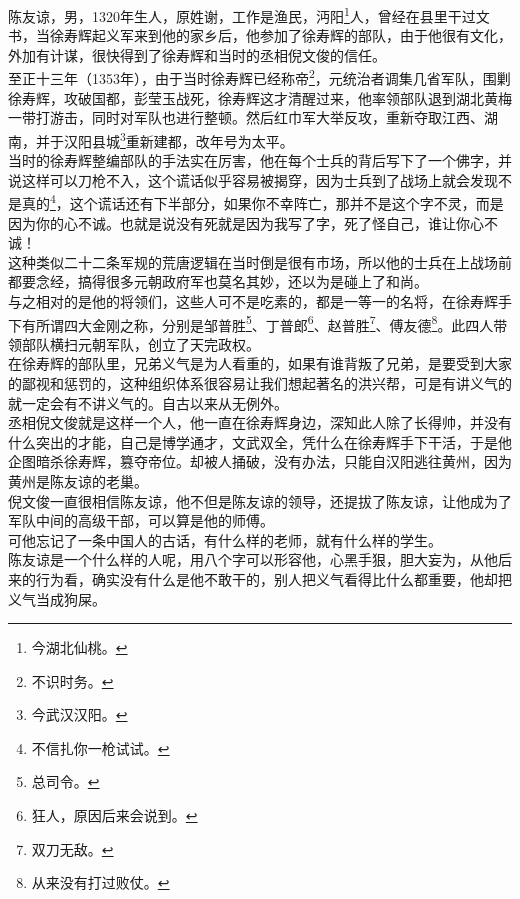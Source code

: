 \begin{multicols}{\theparacolNo}
陈友谅，男，1320年生人，原姓谢，工作是渔民，沔阳\footnote{今湖北仙桃。}人，曾经在县里干过文书，当徐寿辉起义军来到他的家乡后，他参加了徐寿辉的部队，由于他很有文化，外加有计谋，很快得到了徐寿辉和当时的丞相倪文俊的信任。\\

至正十三年（1353年），由于当时徐寿辉已经称帝\footnote{不识时务。}，元统治者调集几省军队，围剿徐寿辉，攻破国都，彭莹玉战死，徐寿辉这才清醒过来，他率领部队退到湖北黄梅一带打游击，同时对军队也进行整顿。然后红巾军大举反攻，重新夺取江西、湖南，并于汉阳县城\footnote{今武汉汉阳。}重新建都，改年号为太平。\\

当时的徐寿辉整编部队的手法实在厉害，他在每个士兵的背后写下了一个佛字，并说这样可以刀枪不入，这个谎话似乎容易被揭穿，因为士兵到了战场上就会发现不是真的\footnote{不信扎你一枪试试。}，这个谎话还有下半部分，如果你不幸阵亡，那并不是这个字不灵，而是因为你的心不诚。也就是说没有死就是因为我写了字，死了怪自己，谁让你心不诚！\\

这种类似二十二条军规的荒唐逻辑在当时倒是很有市场，所以他的士兵在上战场前都要念经，搞得很多元朝政府军也莫名其妙，还以为是碰上了和尚。\\

与之相对的是他的将领们，这些人可不是吃素的，都是一等一的名将，在徐寿辉手下有所谓四大金刚之称，分别是邹普胜\footnote{总司令。}、丁普郎\footnote{狂人，原因后来会说到。}、赵普胜\footnote{双刀无敌。}、傅友德\footnote{从来没有打过败仗。}。此四人带领部队横扫元朝军队，创立了天完政权。\\

在徐寿辉的部队里，兄弟义气是为人看重的，如果有谁背叛了兄弟，是要受到大家的鄙视和惩罚的，这种组织体系很容易让我们想起著名的洪兴帮，可是有讲义气的就一定会有不讲义气的。自古以来从无例外。\\

丞相倪文俊就是这样一个人，他一直在徐寿辉身边，深知此人除了长得帅，并没有什么突出的才能，自己是博学通才，文武双全，凭什么在徐寿辉手下干活，于是他企图暗杀徐寿辉，篡夺帝位。却被人捅破，没有办法，只能自汉阳逃往黄州，因为黄州是陈友谅的老巢。\\

倪文俊一直很相信陈友谅，他不但是陈友谅的领导，还提拔了陈友谅，让他成为了军队中间的高级干部，可以算是他的师傅。\\

可他忘记了一条中国人的古话，有什么样的老师，就有什么样的学生。\\

陈友谅是一个什么样的人呢，用八个字可以形容他，心黑手狠，胆大妄为，从他后来的行为看，确实没有什么是他不敢干的，别人把义气看得比什么都重要，他却把义气当成狗屎。\\


\end{multicols}
